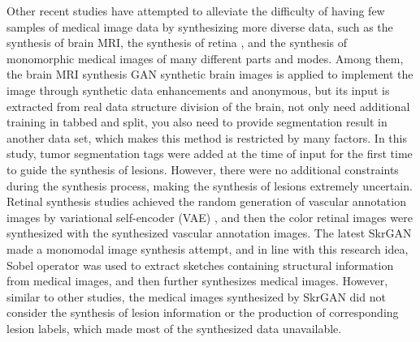 \documentclass[runningheads]{llncs}
\begin{document}
Other recent studies have attempted to alleviate the difficulty of having few samples of medical image data by synthesizing more diverse data, such as the synthesis of brain MRI\cite{4shin2018medical}, the synthesis of retina \cite{41costa2017towards}, and the synthesis of monomorphic medical images of many different parts and modes\cite{96zhang2019skrgan:}. Among them, the brain MRI synthesis \cite{4shin2018medical} GAN synthetic brain images is applied to implement the image through synthetic data enhancements and anonymous, but its input is extracted from real data structure division of the brain, not only need additional training in tabbed and split, you also need to provide segmentation result in another data set, which makes this method is restricted by many factors. In this study, tumor segmentation tags were added at the time of input for the first time to guide the synthesis of lesions. However, there were no additional constraints during the synthesis process, making the synthesis of lesions extremely uncertain. Retinal synthesis studies\cite{41costa2017towards} achieved the random generation of vascular annotation images by variational self-encoder (VAE) \cite{87kingma2014auto-encoding,88rezende2014stochastic}, and then the color retinal images were synthesized with the synthesized vascular annotation images. The latest SkrGAN\cite{96zhang2019skrgan:} made a monomodal image synthesis attempt, and in line with this research idea, Sobel operator was used to extract sketches containing structural information from medical images, and then further synthesizes medical images. However, similar to other studies, the medical images synthesized by SkrGAN did not consider the synthesis of lesion information or the production of corresponding lesion labels, which made most of the synthesized data unavailable.
\end{document}
